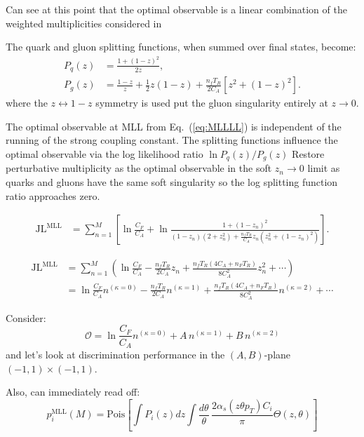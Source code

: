 \documentclass[letterpaper,11pt]{article}
\DeclareRobustCommand{\Eq}[1]{Eq.~(\ref{#1})}
\begin{document}
Can see at this point that the optimal observable is a linear combination of the weighted multiplicities considered in 

The quark and gluon splitting functions, when summed over final states, become:
\begin{align}
P_q(z) & = \frac{1 + (1 - z)^2}{2z},\\
P_g(z) & = \frac{1 - z}{z} + \frac12 z(1-z) + \frac{n_f T_R}{2C_A}[z^2 + (1-z)^2].
\end{align}
where the $z\leftrightarrow 1-z$ symmetry is used put the gluon singularity entirely at $z\to 0$.


The optimal observable at MLL from \Eq{eq:MLLLL} is independent of the running of the strong coupling constant.
%
The splitting functions influence the optimal observable via the log likelihood ratio $\ln P_q(z)/P_g(z)$
%
Restore perturbative multiplicity as the optimal observable in the soft $z_n\to 0$ limit as quarks and gluons have the same soft singularity so the log splitting function ratio approaches zero.

\begin{align}
\label{eq:optobsMLL}
\text{JL}^\text{MLL} & = \sum_{n=1}^M\left[\ln \frac{C_F}{C_A} + \ln \frac{1+(1-z_n)^2}{(1-z_n)(2 + z_n^2) + \frac{n_f T_R}{C_A}z_n(z_n^2 + (1-z_n)^2)} \right].
\end{align}

\begin{align}
\text{JL}^\text{MLL} &= \sum_{n=1}^{M}\left(\ln \frac{C_F}{C_A} - \frac{n_f T_R}{2C_A} z_n + \frac{n_f T_R (4 C_A + n_F T_R)}{8 C_A^2} z_n^2 + \cdots \right)
\\& = \ln \frac{C_F}{C_A} n^{(\kappa = 0 )} - \frac{n_f T_R}{2C_A} n^{(\kappa = 1)} + \frac{n_f T_R (4 C_A + n_F T_R)}{8 C_A^2} n^{(\kappa = 2)} + \cdots
\end{align}

Consider:
\begin{equation}
\mathcal O =  \ln \frac{C_F}{C_A}n^{(\kappa = 0 )} + A \, n^{(\kappa = 1)} + B \, n^{(\kappa = 2)}
\end{equation}
and let's look at discrimination performance in the $(A,B)$-plane $(-1,1)\times(-1,1)$.

Also, can immediately read off:
\begin{equation}
p^\text{MLL}_i(M) = \text{Pois}\left[\int P_i(z)dz \int \frac{d\theta}{\theta}\, \frac{2\alpha_s(z\theta p_T) C_i}{\pi} \Theta(z,\theta)\right]
\end{equation}
\end{document}
